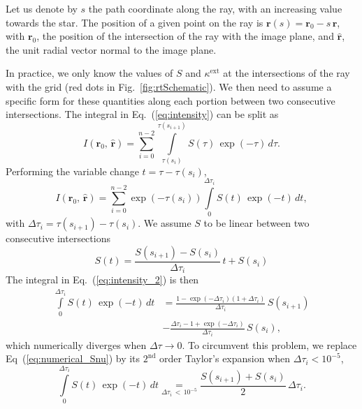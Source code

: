 \documentclass{report}
\newcommand{\rhat}{\hat{\bm{r}}}
\newcommand{\ro}{\bm{r}_0}
\newcommand{\rv}{\bm{r}}
\newcommand{\Dtau}{\Delta \tau}
\newcommand{\kext}{\kappa^\mathrm{ext}}
\newcommand\underrel[2]{\mathrel{\mathop{#2}\limits_{#1}}}
\begin{document}
   Let us denote by $s$ the path coordinate along the ray, with an increasing value towards the star. The position of a given point on the ray is $\rv\left(s\right) = \ro - s \, \rhat$, with $\ro$, the position of the intersection of the ray with the image plane, and $\rhat$, the unit radial vector normal to the image plane.
   
   In practice, we only know the values of $S$ and $\kext$ at the intersections of the ray with the grid (red dots in Fig.~\ref{fig:rtSchematic}). We then need to assume a specific form for these quantities along each portion between two consecutive intersections. The integral in Eq.~(\ref{eq:intensity}) can be split as
  \begin{equation}
      I\left(\ro, \, \rhat \right) = \sum \limits_{i=0}^{n-2} \int \limits_{\tau\left(s_i\right)}^{\tau\left(s_{i+1}\right)} S\left(\tau\right) \, \exp{\left(- \tau\right)} \, d\tau.
  \end{equation}
  Performing the variable change $t = \tau - \tau(s_i)$,
  \begin{equation}
      I\left(\ro, \, \rhat \right) = \sum \limits_{i=0}^{n-2} \exp{\left(- \tau\left(s_i\right)\right)} \int \limits_{0}^{\Dtau_i} S\left(t\right) \, \exp{\left(- t \right)} \, dt, \label{eq:intensity_2}
  \end{equation}
  with $\Dtau_i = \tau\left( s_{i+1} \right) - \tau\left( s_{i} \right)$. We assume $S$ to be linear between two consecutive intersections
  \begin{equation}
      S\left(t\right) = \frac{S(s_{i+1}) - S(s_i)}{\Dtau_i} \, t + S(s_i)
  \end{equation}
  The integral in Eq.~(\ref{eq:intensity_2}) is then
  \begin{equation}
    \begin{split}
      \int \limits_{0}^{\Dtau_i} S\left(t\right) \, \exp{\left(- t \right)} \, dt &= \frac{1 - \exp{\left(-\Dtau_i\right)}\left(1 + \Dtau_i \right)}{\Dtau_i} \, S(s_{i+1}) \\ &- \frac{\Dtau_i - 1 + \exp{\left(-\Dtau_i\right)}}{\Dtau_i} \, S(s_{i}), \label{eq:numerical_Snu}
      \end{split}
  \end{equation}
  which numerically diverges when $\Dtau \to 0$. To circumvent this problem, we replace Eq~(\ref{eq:numerical_Snu}) by its $2^\mathrm{nd}$ order Taylor's expansion when $\Dtau_i < 10^{-5}$,
  \begin{equation}
      \int \limits_{0}^{\Dtau_i} S\left(t\right) \, \exp{\left(- t \right)} \, dt \underrel{\Dtau_i \, < \, 10^{-5}}{=} \frac{S(s_{i+1}) + S(s_{i})}{2} \, \Dtau_i.
  \end{equation}
\end{document}
